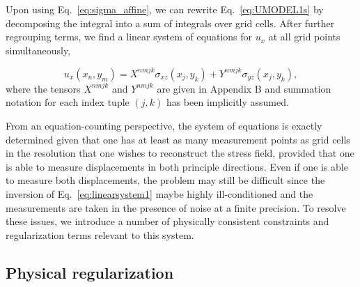 \documentclass[aps,prl,reprint,twocolumn,groupedaddress,showpacs]{revtex4-1}
\begin{document}
Upon using Eq.~\ref{eq:sigma_affine}, we can rewrite
Eq.~\ref{eq:UMODEL1s} by decomposing the integral into a sum of
integrals over grid cells.  After further regrouping terms, we find a
linear system of equations for $u_x$ at all grid points
simultaneously,

\begin{equation}
u_{x}(x_{n},y_{m}) = X^{nmjk}\sigma_{xz}(x_j,y_k) + Y^{nmjk}\sigma_{yz}(x_j,y_k),
\label{eq:linearsystem1}
\end{equation}
%
where the tensors $X^{nmjk}$ and $Y^{nmjk}$ are given in Appendix B and 
summation notation for each index tuple $(j,k)$ has been implicitly assumed.

From an equation-counting perspective, the system of equations is
exactly determined given that one has at least as many measurement
points as grid cells in the resolution that one wishes to reconstruct
the stress field, provided that one is able to measure displacements
in both principle directions. Even if one is able to measure both
displacements, the problem may still be difficult since the inversion
of Eq.~\ref{eq:linearsystem1} maybe highly ill-conditioned and the
measurements are taken in the presence of noise at a finite
precision. To resolve these issues, we introduce a number of
physically consistent constraints and regularization terms relevant to
this system.

\subsection{Physical regularization}
\end{document}
